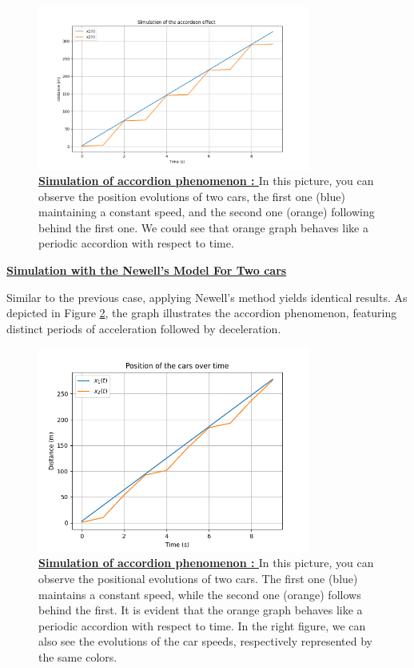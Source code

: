 \documentclass{article}
\begin{document}
		\begin{figure}[H]
			\centering
			\includegraphics[width=0.8\textwidth]{Accordeon1.png}
			\caption[Simulation of accordion phenomenon]{\textbf{\underline{Simulation of accordion phenomenon : }} In this picture, you can observe the position evolutions of two cars, the first one (blue) maintaining a constant speed, and the second one (orange) following behind the first one. We could see that orange graph behaves like a periodic accordion with respect to time.}
			\label{fig:Aco1}
		\end{figure}
		
		\textbf{\underline{Simulation with the Newell's Model For Two cars}} \newline\newline
		
		Similar to the previous case, applying Newell's method yields identical results. As depicted in Figure \ref{fig:1W2_ACCORD}, the graph illustrates the accordion phenomenon, featuring distinct periods of acceleration followed by deceleration.
		
		\begin{figure}[H]
			\centering
			\includegraphics[width=0.8\textwidth]{1W2_Accord.png}
			\caption[Simulation of accordion phenomenon]{\textbf{\underline{Simulation of accordion phenomenon : }} In this picture, you can observe the positional evolutions of two cars. The first one (blue) maintains a constant speed, while the second one (orange) follows behind the first. It is evident that the orange graph behaves like a periodic accordion with respect to time. In the right figure, we can also see the evolutions of the car speeds, respectively represented by the same colors.}
			\label{fig:1W2_ACCORD}
		\end{figure}
		
\end{document}
